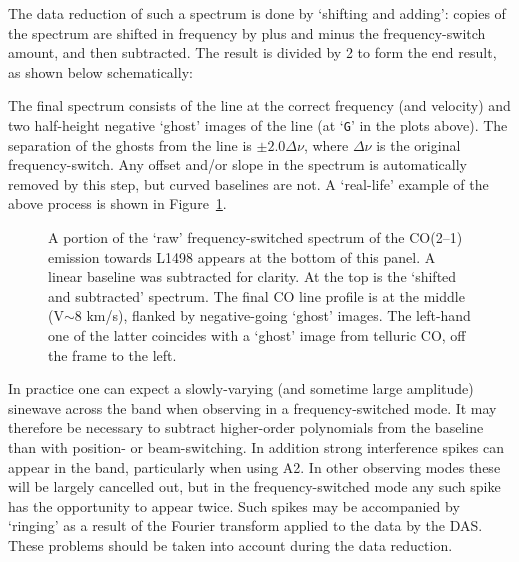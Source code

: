 The data reduction of such a spectrum is done by `shifting and
adding': copies of the spectrum are shifted in frequency by plus and
minus the frequency-switch amount, and then subtracted. The result is
divided by 2 to form the end result, as shown below schematically:

\begin{figure}[ht]
\centering
\leavevmode
\epsfxsize=4.5in
\vspace*{-0.5cm}
\end{figure}

The final spectrum consists of the line at the correct frequency (and
velocity) and two half-height negative `ghost' images of the line (at
`{\tt{G}}' in the plots above). The separation of the ghosts from the
line is $\pm2.0\Delta\nu$, where $\Delta\nu$ is the original
frequency-switch. Any offset and/or slope in the spectrum is
automatically removed by this step, but curved baselines are not. A
`real-life' example of the above process is shown in
Figure~\ref{fig:fsw_reduction}.

\begin{figure}[htb]
\centering
\leavevmode
\epsfxsize=3.5in
\vspace*{-0.5cm}
\begin{center}
\begin{minipage}[t]{5.5in}
\caption[Reducing frequency-switched data]
{\small{A portion of the `raw' frequency-switched spectrum of the CO(2--1)
emission towards L1498 appears at the bottom of this panel. A linear baseline
was subtracted for clarity. At the top is the `shifted and subtracted'
spectrum. The final CO line profile is at the middle (V$\sim 8$ km/s), flanked
by negative-going `ghost' images. The left-hand one of the latter coincides
with a `ghost' image from telluric CO, off the frame to the left. 
}}
\label{fig:fsw_reduction}
\end{minipage}
\end{center}
\end{figure}

In practice one can expect a slowly-varying (and sometime large
amplitude) sinewave across the band when observing in a
frequency-switched mode. It may therefore be necessary to subtract
higher-order polynomials from the baseline than with position- or
beam-switching. In addition strong interference spikes can appear in
the band, particularly when using A2. In other observing modes these
will be largely cancelled out, but in the frequency-switched mode any
such spike has the opportunity to appear twice. Such spikes may be
accompanied by `ringing' as a result of the Fourier transform applied
to the data by the DAS. These problems should be taken into account
during the data reduction.

